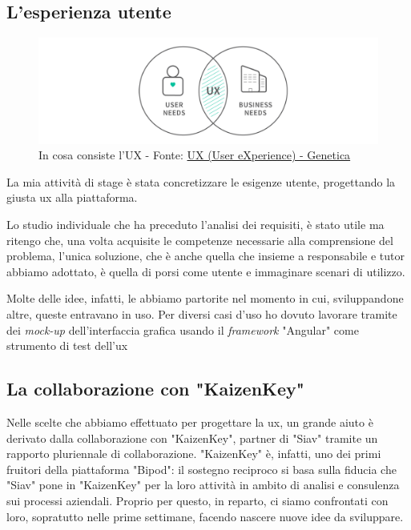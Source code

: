\subsection{L'esperienza utente}
\begin{figure}[H]
    \centering
    \includegraphics[width=0.80\columnwidth]{immagini/uxneeds.png}
    \caption{In cosa consiste l'UX - Fonte: \href{https://www.genetica.marketing/user-experience-di-cosa-si-tratta/}{UX (User eXperience) - Genetica}}
    \label{fig:ux}
\end{figure}
La mia attività di stage è stata concretizzare le esigenze utente, progettando la giusta \acrshort{ux} alla piattaforma.

Lo studio individuale che ha preceduto l'analisi dei requisiti, è stato utile ma ritengo che, una volta acquisite le competenze necessarie alla comprensione del problema, l'unica soluzione, che è anche quella che insieme a responsabile e tutor abbiamo adottato, è quella di porsi come utente e immaginare scenari di utilizzo.

Molte delle idee, infatti, le abbiamo partorite nel momento in cui, sviluppandone altre, queste entravano in uso.
Per diversi casi d'uso ho dovuto lavorare tramite dei \textit{mock-up} dell'interfaccia grafica usando il \textit{framework} "Angular" come strumento di test dell'\acrlong{ux}
\newpage
\subsection{La collaborazione con "KaizenKey"}
Nelle scelte che abbiamo effettuato per progettare la \acrlong{ux}, un grande aiuto è derivato dalla collaborazione con "KaizenKey", partner di "Siav" tramite un rapporto pluriennale di collaborazione. "KaizenKey" è, infatti, uno dei primi fruitori della piattaforma "Bipod": il sostegno reciproco si basa sulla fiducia che "Siav" pone in "KaizenKey" per la loro attività in ambito di analisi e consulenza sui processi aziendali. Proprio per questo, in reparto, ci siamo confrontati con loro, sopratutto nelle prime settimane, facendo nascere nuove idee da sviluppare.

